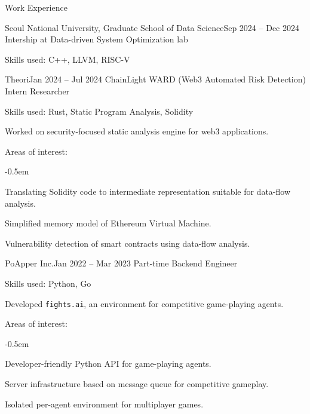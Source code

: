 \documentclass{resume}
\begin{document}
\begin{res-section}{Work Experience}
  \begin{res-subsection}{Seoul National University, Graduate School of Data Science}{Sep 2024 -- Dec 2024}
    Intership at Data-driven System Optimization lab

    \item Skills used: C++, LLVM, RISC-V
  \end{res-subsection}

  \begin{res-subsection}{Theori}{Jan 2024 -- Jul 2024}
    ChainLight WARD (Web3 Automated Risk Detection) Intern Researcher

    \item Skills used: Rust, Static Program Analysis, Solidity

    \item Worked on security-focused static analysis engine for web3 applications.

    \item Areas of interest:
    \vspace{-0.5em}
    \begin{list}{--}{}
      \itemsep -0.5em
      \item Translating Solidity code to intermediate representation suitable for data-flow analysis.
      \item Simplified memory model of Ethereum Virtual Machine.
      \item Vulnerability detection of smart contracts using data-flow analysis.
    \end{list}
  \end{res-subsection}

  \begin{res-subsection}{PoApper Inc.}{Jan 2022 -- Mar 2023}
    Part-time Backend Engineer

    \item Skills used: Python, Go

    \item Developed \texttt{fights.ai}, an environment for competitive game-playing agents.

    \item Areas of interest:
    \vspace{-0.5em}
    \begin{list}{--}{}
      \itemsep -0.5em
      \item Developer-friendly Python API for game-playing agents.
      \item Server infrastructure based on message queue for competitive gameplay.
      \item Isolated per-agent environment for multiplayer games.
    \end{list}
  \end{res-subsection}
\end{res-section}
\end{document}
